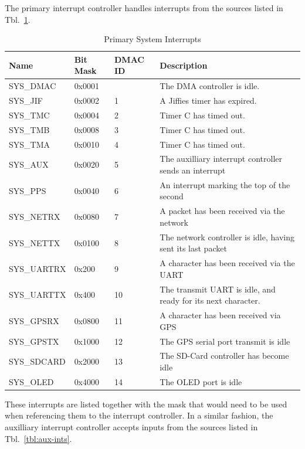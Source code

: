 \documentclass{gqtekspec}
\begin{document}
The primary interrupt controller handles interrupts from the sources listed
in Tbl.~\ref{tbl:sys-ints}. 
\begin{table}[htbp]
\begin{center}\begin{tabular}{|p{0.9in}|p{0.75in}|p{0.75in}|p{3.00in}|}\hline
\rowcolor[gray]{0.85} Name & Bit Mask & DMAC ID &Description \\\hline\hline
SYS\_DMAC   & 0x0001 && The DMA controller is idle.\\\hline
SYS\_JIF    & 0x0002 & 1 & A Jiffies timer has expired.\\\hline
SYS\_TMC    & 0x0004 & 2 & Timer C has timed out.\\\hline
SYS\_TMB    & 0x0008 & 3 & Timer C has timed out.\\\hline
SYS\_TMA    & 0x0010 & 4 & Timer C has timed out.\\\hline
SYS\_AUX    & 0x0020 & 5 & The auxilliary interrupt controller sends an interrupt\\\hline
SYS\_PPS    & 0x0040 & 6 & An interrupt marking the top of the second\\\hline
SYS\_NETRX  & 0x0080 & 7 & A packet has been received via the network\\\hline
SYS\_NETTX  & 0x0100 & 8 & The network controller is idle, having sent its
			last packet\\\hline
SYS\_UARTRX & 0x200 &  9 & A character has been received via the UART\\\hline
SYS\_UARTTX & 0x400 & 10 & The transmit UART is idle, and ready for its next
		character.\\\hline
SYS\_GPSRX  & 0x0800 & 11 & A character has been received via GPS\\\hline
SYS\_GPSTX  & 0x1000 & 12 & The GPS serial port transmit is idle\\\hline
SYS\_SDCARD & 0x2000 & 13 & The SD-Card controller has become idle\\\hline
SYS\_OLED   & 0x4000 & 14 & The OLED port is idle\\\hline
\end{tabular}
\caption{Primary System Interrupts}\label{tbl:sys-ints}
\end{center}\end{table}
These interrupts are listed together with the
mask that would need to be used when referencing them to the interrupt
controller.  In a similar fashion, the auxilliary interrupt controller accepts
inputs from the sources listed in Tbl.~\ref{tbl:aux-ints}.  
\end{document}
